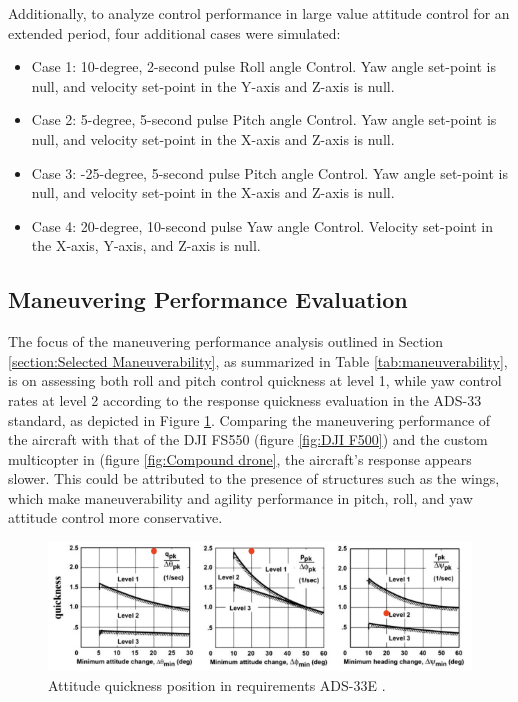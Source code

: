 Additionally, to analyze control performance in large value attitude control for an extended period, four additional cases were simulated:

\begin{itemize}
    \item Case 1: 10-degree, 2-second pulse Roll angle Control. Yaw angle set-point is null, and velocity set-point in the Y-axis and Z-axis is null.
    \item Case 2: 5-degree, 5-second pulse Pitch angle Control. Yaw angle set-point is null, and velocity set-point in the X-axis and Z-axis is null.
    \item Case 3: -25-degree, 5-second pulse Pitch angle Control. Yaw angle set-point is null, and velocity set-point in the X-axis and Z-axis is null.
    \item Case 4: 20-degree, 10-second pulse Yaw angle Control. Velocity set-point in the X-axis, Y-axis, and Z-axis is null.
\end{itemize}

\subsection{Maneuvering Performance Evaluation}

The focus of the maneuvering performance analysis outlined in Section \ref{section:Selected Maneuverability}, as summarized in Table \ref{tab:maneuverability}, is on assessing both roll and pitch control quickness at level 1, while yaw control rates at level 2 according to the response quickness evaluation in the ADS-33 standard, as depicted in Figure \ref{fig:quickness position}. Comparing the maneuvering performance of the aircraft with that of the DJI FS550 (figure \ref{fig:DJI F500}) and the custom multicopter in \cite{Verbeke} (figure \ref{fig:Compound drone}, the aircraft's response appears slower. This could be attributed to the presence of structures such as the wings, which make maneuverability and agility performance in pitch, roll, and yaw attitude control more conservative.

\begin{figure}
    \centering
    \includegraphics[width=0.95\linewidth]{Images/Attitude quickness requirements2.png}
    \caption{Attitude quickness position in requirements ADS-33E \cite{ADS-33}.}
    \label{fig:quickness position}
\end{figure}


